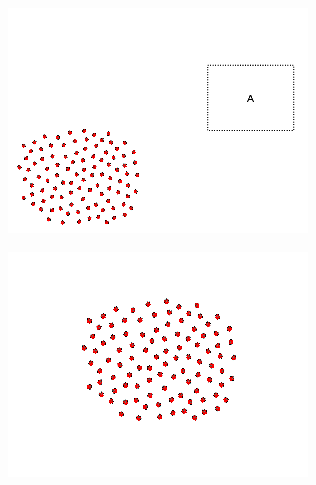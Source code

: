 \begin{minipage}{\linewidth}
	\centering	
	\begin{minipage}{0.42\linewidth}
		\includegraphics[width=\linewidth]{../ui_experiment/slide_images/Swarm_Robot_Control_-_100_Robot_0035.png}
		\label{fig:sub1}
	\end{minipage}
	\hspace{0.05\linewidth}
	\begin{minipage}{0.42\linewidth}
		\includegraphics[width=\linewidth]{../ui_experiment/slide_images/Swarm_Robot_Control_-_100_Robot_0037.png}
		\label{fig:sub2}
	\end{minipage}
	\label{fig:100_robot_slides}
\end{minipage}


